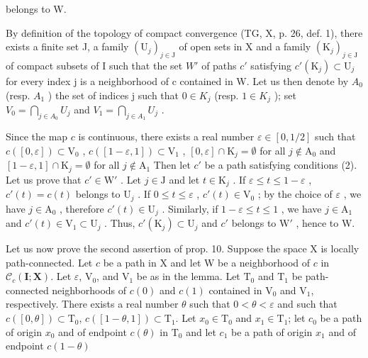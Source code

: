 belongs to W.

By definition of the topology of compact convergence (TG, X, p. 26, def. 1), there exists a finite set J, a family \((\mathrm{U}_{j})_{j\in\mathrm{J}}\) of open sets in X and a family \((\mathrm{K}_{j})_{j\in\mathrm{J}}\) of compact subsets of I such that the set \(W'\) of paths \(c'\) satisfying \(c'(\mathrm{K}_{j})\subset\mathrm{U}_{j}\) for every index j is a neighborhood of c contained in W. Let us then denote by \(A_{0}\) (resp. \(A_{1}\) ) the set of indices j such that \(0\in K_{j}\) (resp. \(1\in K_{j}\) ); set \(V_{0}=\bigcap_{j\in A_{0}}U_{j}\) and \(V_{1}=\bigcap_{j\in A_{1}}U_{j}\) .

Since the map \(c\) is continuous, there exists a real number \(\varepsilon \in [0,1/2]\) such that \(c([0,\varepsilon]) \subset \mathrm{V}_0\) , \(c([1-\varepsilon,1]) \subset \mathrm{V}_1\) , \([0,\varepsilon] \cap \mathrm{K}_j = \emptyset\) for all \(j \notin \mathrm{A}_0\) and \([1-\varepsilon,1] \cap \mathrm{K}_j = \emptyset\) for all \(j \notin \mathrm{A}_1\) Then let \(c'\) be a path satisfying conditions (2). Let us prove that \(c' \in \mathrm{W}'\) . Let \(j \in \mathrm{J}\) and let \(t \in \mathrm{K}_j\) . If \(\varepsilon \leqslant t \leqslant 1-\varepsilon\) , \(c'(t) = c(t)\) belongs to \(\mathrm{U}_j\) . If \(0 \leqslant t \leqslant \varepsilon\) , \(c'(t) \in \mathrm{V}_0\) ; by the choice of \(\varepsilon\) , we have \(j \in \mathrm{A}_0\) , therefore \(c'(t) \in \mathrm{U}_j\) . Similarly, if \(1-\varepsilon \leqslant t \leqslant 1\) , we have \(j \in \mathrm{A}_1\) and \(c'(t) \in \mathrm{V}_1 \subset \mathrm{U}_j\) . Thus, \(c'(\mathrm{K}_j) \subset \mathrm{U}_j\) and \(c'\) belongs to \(\mathrm{W}'\) , hence to W.

Let us now prove the second assertion of prop. 10. Suppose the space X is locally path-connected. Let \(c\) be a path in X and let W be a neighborhood of \(c\) in \(\mathcal{C}_c(\mathbf{I};\mathbf{X})\). Let \(\varepsilon\), \(\mathrm{V}_0\), and \(\mathrm{V}_1\) be as in the lemma. Let \(\mathrm{T}_0\) and \(\mathrm{T}_1\) be path-connected neighborhoods of \(c(0)\) and \(c(1)\) contained in \(\mathrm{V}_0\) and \(\mathrm{V}_1\), respectively. There exists a real number \(\theta\) such that \(0 < \theta < \varepsilon\) and such that \(c([0,\theta]) \subset \mathrm{T}_0\), \(c([1 - \theta,1]) \subset \mathrm{T}_1\). Let \(x_0 \in \mathrm{T}_0\) and \(x_1 \in \mathrm{T}_1\); let \(c_0\) be a path of origin \(x_0\) and of endpoint \(c(\theta)\) in \(\mathrm{T}_0\) and let \(c_1\) be a path of origin \(x_1\) and of endpoint \(c(1 - \theta)\)

